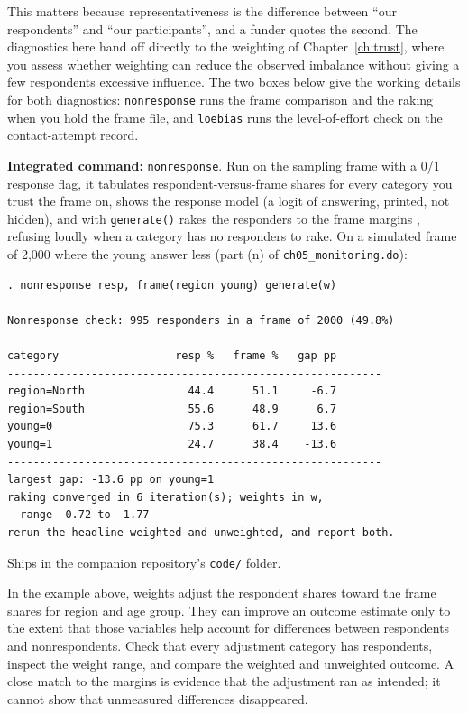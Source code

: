 \documentclass[
    a4paper,
    fontsize=10pt,
    twoside=true,
    numbers=noenddot,
]{kaobook}
\begin{document}
This matters because representativeness is the difference between \enquote{our respondents} and \enquote{our participants}, and a funder quotes the second. The diagnostics here hand off directly to the weighting of Chapter~\ref{ch:trust}, where you assess whether weighting can reduce the observed imbalance without giving a few respondents excessive influence. The two boxes below give the working details for both diagnostics: \texttt{nonresponse} runs the frame comparison and the raking when you hold the frame file, and \texttt{loebias} runs the level-of-effort check on the contact-attempt record.

\begin{kaobox}[frametitle=Package Integration: \texttt{nonresponse}]
\textbf{Integrated command:} \texttt{nonresponse}. Run on the sampling frame with a 0/1 response flag, it tabulates respondent-versus-frame shares for every category you trust the frame on, shows the response model (a logit of answering, printed, not hidden), and with \texttt{generate()} rakes the responders to the frame margins \parencite{deming1940raking}, refusing loudly when a category has no responders to rake. On a simulated frame of 2{,}000 where the young answer less (part (n) of \texttt{ch05\_monitoring.do}):
\par
{\footnotesize
\begin{verbatim}
. nonresponse resp, frame(region young) generate(w)

Nonresponse check: 995 responders in a frame of 2000 (49.8%)
----------------------------------------------------------
category                  resp %   frame %   gap pp
----------------------------------------------------------
region=North                44.4      51.1     -6.7
region=South                55.6      48.9      6.7
young=0                     75.3      61.7     13.6
young=1                     24.7      38.4    -13.6
----------------------------------------------------------
largest gap: -13.6 pp on young=1
raking converged in 6 iteration(s); weights in w,
  range  0.72 to  1.77
rerun the headline weighted and unweighted, and report both.
\end{verbatim}
}
Ships in the companion repository's \texttt{code/} folder.
\end{kaobox}

In the example above, weights adjust the respondent shares toward the frame shares for region and age group. They can improve an outcome estimate only to the extent that those variables help account for differences between respondents and nonrespondents. Check that every adjustment category has respondents, inspect the weight range, and compare the weighted and unweighted outcome. A close match to the margins is evidence that the adjustment ran as intended; it cannot show that unmeasured differences disappeared.
\end{document}
